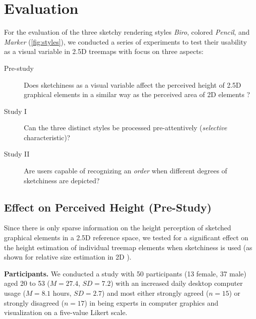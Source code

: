 
\section{Evaluation}
\label{sec:evaluation}

\noindent 
For the evaluation of the three sketchy rendering styles \emph{Biro}, colored \emph{Pencil}, and \emph{Marker} (\autoref{fig:styles}), we conducted a series of experiments to test their usability as a visual variable in 2.5D treemaps with focus on three aspects:
\begin{description}

	\item[Pre-study] 
	Does sketchiness as a visual variable affect the perceived height of 2.5D graphical elements in a similar way as the perceived area of 2D elements \cite{Wood2012}?
	
	\item[Study I] 
	Can the three distinct styles be processed pre-attentively (\emph{selective} characteristic)?
	
	\item[Study II]
	Are users capable of recognizing an \emph{order} when different degrees of sketchiness are depicted?
\end{description} 

\subsection{Effect on Perceived Height (Pre-Study)}
\label{sec:prestudy}

\noindent 
Since there is only sparse information on the height perception of sketched graphical elements in a 2.5D reference space, we tested for a significant effect on the height estimation of individual treemap elements when sketchiness is used (as shown for relative size estimation in 2D \cite{Wood2012}).

\textbf{Participants.}
We conducted a study with 50 participants (13 female, 37 male) aged 20 to 53 ($\mathit{M} = 27.4$, $\mathit{SD} = 7.2$) with an increased daily desktop computer usage ($\mathit{M} = 8.1$ hours, $\mathit{SD} = 2.7$) and most either strongly agreed ($n = 15$) or strongly disagreed ($n = 17$) in being experts in computer graphics and visualization on a five-value Likert scale. 

